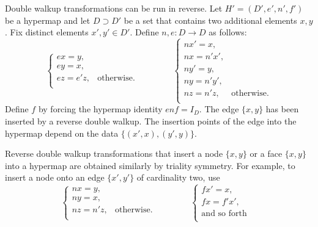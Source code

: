 \begin{remark}\label{rem:reverse-double-walkup}
Double walkup transformations can be run in reverse.
Let $H'=(D',e',n',f')$ be
a hypermap and let $D\supset D'$ be a set that contains two additional elements
$x,y$.  Fix distinct elements $x',y'\in D'$.  Define $n,e:D\to D$ as follows:
\[ 
  \begin{cases} 
e x = y, &\\
e y = x,&\\
e z = e' z,&\text{otherwise.}\\
\end{cases}
\qquad\qquad
\begin{cases} 
  n x' = x, &\\
  n x =  n' x',&\\
  n y' = y,&\\
  n y =  n' y',&\\
  n z = n' z, &\text{otherwise.}\\
\end{cases}
\] 
Define $f$ by forcing the hypermap identity $e n f = I_D$.  The edge
$\{x,y\}$ has been inserted by a reverse double walkup.  The insertion
points of the edge into the hypermap depend on the data
$\{(x',x),(y',y)\}$.

Reverse double walkup transformations that insert a node $\{x,y\}$ or
a face $\{x,y\}$ into a hypermap are obtained similarly by triality
symmetry.  For example, to insert a node onto an edge $\{x',y'\}$ of
cardinality two, use
\[ 
\begin{cases} 
n x = y, &\\
n y = x,&\\
n z = n' z,&\text{otherwise.}\\
\end{cases}
\qquad\qquad
\begin{cases} 
f x' = x, &\\
f x =  f' x',&\\
\text{and so forth}&\\%
\end{cases}
\] 
%
\end{remark}

